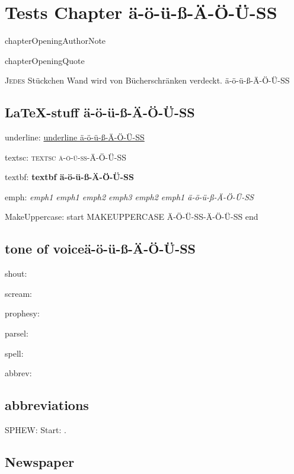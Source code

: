\chapter{Tests Chapter ä-ö-ü-ß-Ä-Ö-Ü-SS}

\begin{chapterOpeningAuthorNote}
chapterOpeningAuthorNote
\end{chapterOpeningAuthorNote}
\begin{chapterOpeningQuote}
chapterOpeningQuote
\end{chapterOpeningQuote}

\lettrine{J}{edes} Stückchen Wand wird von Bücherschränken verdeckt. ä-ö-ü-ß-Ä-Ö-Ü-SS

\section{\LaTeX-stuff ä-ö-ü-ß-Ä-Ö-Ü-SS}
underline: \underline{underline ä-ö-ü-ß-Ä-Ö-Ü-SS}

textsc: \textsc{textsc ä-ö-ü-ß-Ä-Ö-Ü-SS}

textbf: \textbf{textbf ä-ö-ü-ß-Ä-Ö-Ü-SS}

emph: \emph{emph1 emph1 \emph{emph2 \emph{emph3} emph2} emph1 ä-ö-ü-ß-Ä-Ö-Ü-SS}

MakeUppercase: start \MakeUppercase{MakeUppercase ä-ö-ü-ß-Ä-Ö-Ü-SS} end

\section{tone of voiceä-ö-ü-ß-Ä-Ö-Ü-SS}

shout: 

scream: 

prophesy: 

parsel: 

spell: 

abbrev: 

\section{abbreviations}
SPHEW: Start: \SPHEW.

\section{Newspaper}

